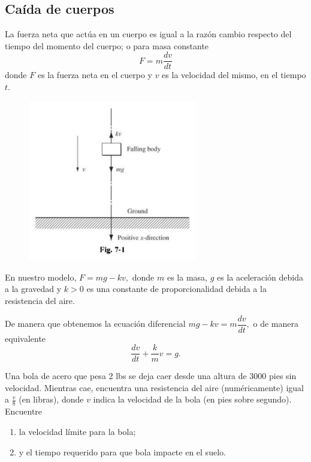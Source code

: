 \subsection{Caída de cuerpos}


	\begin{observacion}
		La fuerza neta que actúa en un cuerpo es igual a la razón cambio respecto del tiempo del momento del cuerpo; o para masa constante
		\[
			\label{bron:7.3}
			F=m\dfrac{dv}{dt}
		\]
		donde $F$ es la fuerza neta en el cuerpo y $v$ es la velocidad del mismo, en el tiempo $t.$
	\end{observacion}





	\begin{figure}
		\centering
		\includegraphics[height=7cm,keepaspectratio=true]{./edo/img020501.png}
		\label{fig:020501}
	\end{figure}




	En nuestro modelo, $F= mg - kv,$ donde $m$ es la masa, $g$ es la aceleración debida a la gravedad y $k>0$ es una constante de proporcionalidad debida a la resistencia del aire.



	De manera que obtenemos la ecuación diferencial $mg-kv=m\dfrac{dv}{dt},$ o de manera equivalente
	\[
		\label{bron:7.4}
		\dfrac{dv}{dt}+\dfrac{k}{m}v=g.
	\]

  \begin{problema}
   Una bola de acero que pesa 2 lbs se deja caer desde una altura de 3000 pies sin velocidad. Mientras cae, encuentra una resistencia del aire (numéricamente) igual a $\frac{v}{8}$ (en libras), donde $v$ indica la velocidad de la bola (en pies sobre segundo). Encuentre
   \begin{enumerate}
    \item la velocidad límite para la bola;
    \item y el tiempo requerido para que bola impacte en el suelo.
   \end{enumerate}

  \end{problema}




